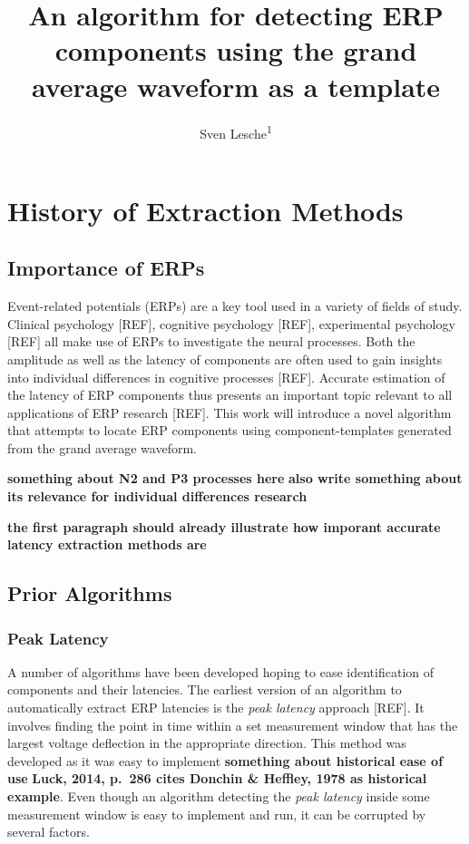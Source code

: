 \documentclass[
  man,floatsintext]{apa7}
\title{An algorithm for detecting ERP components using the grand average waveform as a template}
\author{Sven Lesche\textsuperscript{1}}
\date{}
\affiliation{\vspace{0.5cm}\textsuperscript{1} Ruprecht-Karls-University Heidelberg}
\begin{document}
\maketitle

\hypertarget{history-of-extraction-methods}{%
\section{History of Extraction Methods}\label{history-of-extraction-methods}}

\hypertarget{importance-of-erps}{%
\subsection{Importance of ERPs}\label{importance-of-erps}}

Event-related potentials (ERPs) are a key tool used in a variety of fields of study. Clinical psychology {[}REF{]}, cognitive psychology {[}REF{]}, experimental psychology {[}REF{]} all make use of ERPs to investigate the neural processes. Both the amplitude as well as the latency of components are often used to gain insights into individual differences in cognitive processes {[}REF{]}. Accurate estimation of the latency of ERP components thus presents an important topic relevant to all applications of ERP research {[}REF{]}. This work will introduce a novel algorithm that attempts to locate ERP components using component-templates generated from the grand average waveform.

\textbf{something about N2 and P3 processes here} \textbf{also write something about its relevance for individual differences research}

\textbf{the first paragraph should already illustrate how imporant accurate latency extraction methods are}

\hypertarget{prior-algorithms}{%
\subsection{Prior Algorithms}\label{prior-algorithms}}

\hypertarget{peak-latency}{%
\subsubsection{Peak Latency}\label{peak-latency}}

A number of algorithms have been developed hoping to ease identification of components and their latencies. The earliest version of an algorithm to automatically extract ERP latencies is the \emph{peak latency} approach {[}REF{]}. It involves finding the point in time within a set measurement window that has the largest voltage deflection in the appropriate direction. This method was developed as it was easy to implement \textbf{something about historical ease of use} \textbf{Luck, 2014, p.~286 cites Donchin \& Heffley, 1978 as historical example}. Even though an algorithm detecting the \emph{peak latency} inside some measurement window is easy to implement and run, it can be corrupted by several factors.
\end{document}
